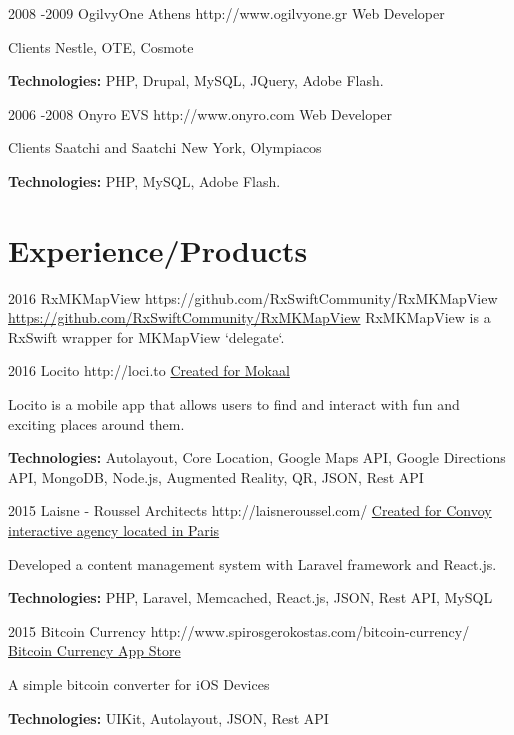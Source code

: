 \documentclass[10pt]{article}
\begin{document}

\job
{2008 -}{2009}
{OgilvyOne Athens}
{http://www.ogilvyone.gr}
{Web Developer}
{Clients Nestle, OTE, Cosmote
\\
\rule{0mm}{5mm}\textbf{Technologies:} PHP, Drupal, MySQL, JQuery, Adobe Flash.}


\job
{2006 -}{2008}
{Onyro EVS}
{http://www.onyro.com}
{Web Developer}
{Clients Saatchi and Saatchi New York, Olympiacos
\\
\rule{0mm}{5mm}\textbf{Technologies:} PHP, MySQL, Adobe Flash.}


\section{Experience/Products}

\job
{2016}{}
{RxMKMapView}
{https://github.com/RxSwiftCommunity/RxMKMapView}
{\href{https://github.com/RxSwiftCommunity/RxMKMapView/}{https://github.com/RxSwiftCommunity/RxMKMapView}}
{RxMKMapView is a RxSwift wrapper for MKMapView `delegate`.}

\job
{2016}{}
{Locito}
{http://loci.to}
{\href{http://www.mokaal.com/index.html}{Created for Mokaal}}
{Locito is a mobile app that allows users to find and interact with fun and exciting places around them.
\\
\rule{0mm}{5mm}\textbf{Technologies:} Autolayout, Core Location, Google Maps API, Google Directions API, MongoDB, Node.js, Augmented Reality, QR, JSON, Rest API}

\job
{2015}{}
{Laisne - Roussel Architects}
{http://laisneroussel.com/}
{\href{http://www.convoy.me}{Created for Convoy interactive agency located in Paris}}
{Developed a content management system with Laravel framework and React.js.
\\
\rule{0mm}{5mm}\textbf{Technologies:} PHP, Laravel, Memcached, React.js, JSON, Rest API, MySQL}

\job
{2015}{}
{Bitcoin Currency}
{http://www.spirosgerokostas.com/bitcoin-currency/}
{\href{https://itunes.apple.com/us/app/bitcoin-currency/id946708232?ls=1&mt=8}{Bitcoin Currency App Store}}
{A simple bitcoin converter for iOS Devices
\\
\rule{0mm}{5mm}\textbf{Technologies:} UIKit, Autolayout, JSON, Rest API}
\end{document}
